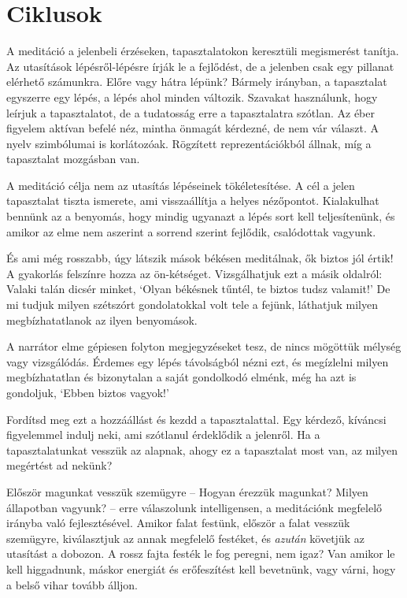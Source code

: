 \chapter{Ciklusok}


\noindent A meditáció a jelenbeli érzéseken, tapasztalatokon keresztüli
megismerést tanítja. Az utasítások lépésről-lépésre írják le a
fejlődést, de a jelenben csak egy pillanat elérhető számunkra. Előre
vagy hátra lépünk? Bármely irányban, a tapasztalat egyszerre egy lépés,
a lépés ahol minden változik. Szavakat használunk, hogy leírjuk a
tapasztalatot, de a tudatosság erre a tapasztalatra szótlan. Az éber
figyelem aktívan befelé néz, mintha önmagát kérdezné, de nem vár
választ. A nyelv szimbólumai is korlátozóak. Rögzített reprezentációkból
állnak, míg a tapasztalat mozgásban van.

A meditáció célja nem az utasítás lépéseinek tökéletesítése. A cél a
jelen tapasztalat tiszta ismerete, ami visszaállítja a helyes
nézőpontot. Kialakulhat bennünk az a benyomás, hogy mindig ugyanazt a
lépés sort kell teljesítenünk, és amikor az elme nem aszerint a sorrend
szerint fejlődik, csalódottak vagyunk.


És ami még rosszabb, úgy látszik mások békésen meditálnak, ők biztos jól
értik! A gyakorlás felszínre hozza az ön-kétséget. Vizsgálhatjuk ezt a
másik oldalról: Valaki talán dicsér minket, `Olyan békésnek tűntél, te
biztos tudsz valamit!' De mi tudjuk milyen szétszórt gondolatokkal volt
tele a fejünk, láthatjuk milyen megbízhatatlanok az ilyen benyomások.

A narrátor elme gépiesen folyton megjegyzéseket tesz, de nincs mögöttük
mélység vagy vizsgálódás. Érdemes egy lépés távolságból nézni ezt, és
megízlelni milyen megbízhatatlan és bizonytalan a saját gondolkodó
elménk, még ha azt is gondoljuk, `Ebben biztos vagyok!'

Fordítsd meg ezt a hozzáállást és kezdd a tapasztalattal. Egy kérdező,
kíváncsi figyelemmel indulj neki, ami szótlanul érdeklődik a jelenről.
Ha a tapasztalatunkat vesszük az alapnak, ahogy ez a tapasztalat most
van, az milyen megértést ad nekünk?

Először magunkat vesszük szemügyre -- Hogyan érezzük magunkat? Milyen
állapotban vagyunk? -- erre válaszolunk intelligensen, a meditációnk
megfelelő irányba való fejlesztésével. Amikor falat festünk, először a
falat vesszük szemügyre, kiválasztjuk az annak megfelelő festéket, és
\emph{azután} követjük az utasítást a dobozon. A rossz fajta festék le
fog peregni, nem igaz? Van amikor le kell higgadnunk, máskor energiát és
erőfeszítést kell bevetnünk, vagy várni, hogy a belső vihar tovább
álljon.

